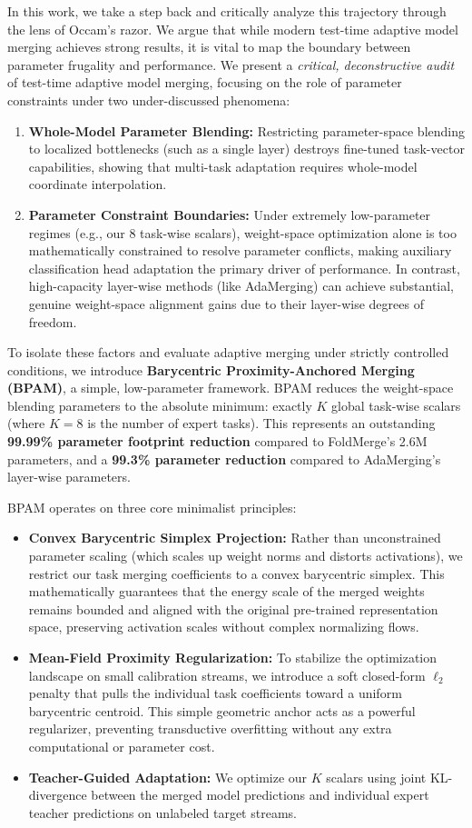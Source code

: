 In this work, we take a step back and critically analyze this trajectory through the lens of Occam's razor. We argue that while modern test-time adaptive model merging achieves strong results, it is vital to map the boundary between parameter frugality and performance. We present a {\it critical, deconstructive audit} of test-time adaptive model merging, focusing on the role of parameter constraints under two under-discussed phenomena:
\begin{enumerate}
    \item {\bf Whole-Model Parameter Blending:} Restricting parameter-space blending to localized bottlenecks (such as a single layer) destroys fine-tuned task-vector capabilities, showing that multi-task adaptation requires whole-model coordinate interpolation.
    \item {\bf Parameter Constraint Boundaries:} Under extremely low-parameter regimes (e.g., our 8 task-wise scalars), weight-space optimization alone is too mathematically constrained to resolve parameter conflicts, making auxiliary classification head adaptation the primary driver of performance. In contrast, high-capacity layer-wise methods (like AdaMerging) can achieve substantial, genuine weight-space alignment gains due to their layer-wise degrees of freedom.
\end{enumerate}

To isolate these factors and evaluate adaptive merging under strictly controlled conditions, we introduce {\bf Barycentric Proximity-Anchored Merging (BPAM)}, a simple, low-parameter framework. BPAM reduces the weight-space blending parameters to the absolute minimum: exactly $K$ global task-wise scalars (where $K=8$ is the number of expert tasks). This represents an outstanding {\bf 99.99\% parameter footprint reduction} compared to FoldMerge's 2.6M parameters, and a {\bf 99.3\% parameter reduction} compared to AdaMerging's layer-wise parameters.

BPAM operates on three core minimalist principles:
\begin{itemize}
    \item {\bf Convex Barycentric Simplex Projection:} Rather than unconstrained parameter scaling (which scales up weight norms and distorts activations), we restrict our task merging coefficients to a convex barycentric simplex. This mathematically guarantees that the energy scale of the merged weights remains bounded and aligned with the original pre-trained representation space, preserving activation scales without complex normalizing flows.
    \item {\bf Mean-Field Proximity Regularization:} To stabilize the optimization landscape on small calibration streams, we introduce a soft closed-form $\ell_2$ penalty that pulls the individual task coefficients toward a uniform barycentric centroid. This simple geometric anchor acts as a powerful regularizer, preventing transductive overfitting without any extra computational or parameter cost.
    \item {\bf Teacher-Guided Adaptation:} We optimize our $K$ scalars using joint KL-divergence between the merged model predictions and individual expert teacher predictions on unlabeled target streams.
\end{itemize}

